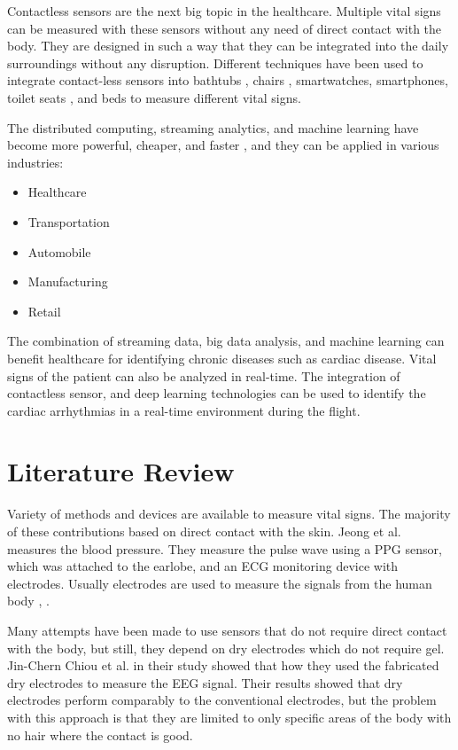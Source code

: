 Contactless sensors are the next big topic in the healthcare. Multiple vital signs can be measured with these sensors without any need of direct contact with the body. They are designed in such a way that they can be integrated into the daily surroundings without any disruption. Different techniques have been used to integrate contact-less sensors into bathtubs \cite{lim2004ecg}, chairs \cite{aleksandrowicz2007wireless}, smartwatches, smartphones, toilet seats \cite{kim2004electrically}, and beds \cite{wu2008contactless} to measure different vital signs. 

The distributed computing, streaming analytics, and machine learning have become more powerful, cheaper, and faster \cite{maprmliotmed}, and they can be applied in various industries:

\begin{itemize}
	\item Healthcare
	\item Transportation
	\item Automobile
	\item Manufacturing
	\item Retail
\end{itemize}


The combination of streaming data, big data analysis, and machine learning can benefit healthcare for identifying chronic diseases such as cardiac disease. Vital signs of the patient can also be analyzed in real-time. The integration of contactless sensor, and deep learning technologies can be used to identify the cardiac arrhythmias in a real-time environment during the flight.

\section{Literature Review}

Variety of methods and devices are available to measure vital signs. The majority of these contributions based on direct contact with the skin. Jeong et al. \cite{jeong2005continuous} measures the blood pressure. They measure the pulse wave using a PPG sensor, which was attached to the earlobe, and an ECG monitoring device with electrodes. Usually electrodes are used to measure the signals from the human body \cite{shen2007detection}, \cite{neuman1998biopotential}.

Many attempts have been made to use sensors that do not require direct contact with the body, but still, they depend on dry electrodes which do not require gel. Jin-Chern Chiou et al. in their study \cite{4600301} showed that how they used the fabricated dry electrodes to measure the EEG signal. Their results showed that dry electrodes perform comparably to the conventional electrodes, but the problem with this approach is that they are limited to only specific areas of the body with no hair where the contact is good.

